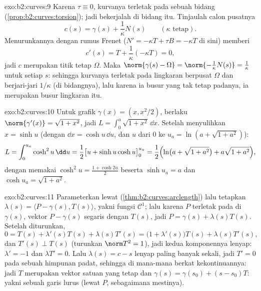 \begin{solution}{exo:b2:curves:9}
Karena $\tau \equiv 0$, kurvanya terletak pada sebuah bidang
(\cref{prop:b2:curves:torsion}); jadi bekerjalah di bidang itu. Tinjaulah
calon pusatnya
\[
c(s) = \gamma(s) + \frac{1}{\kappa}N(s)
\qquad (\kappa \text{ tetap}).
\]
Menurunkannya dengan rumus Frenet ($N' = -\kappa T + \tau B
= -\kappa T$ di sini) memberi
\[
c'(s) = T + \frac1\kappa(-\kappa T) = 0 ,
\]
jadi $c$ merupakan titik tetap $\Omega$. Maka $\norm{\gamma(s) -
\Omega} = \norm{-\frac1\kappa N(s)} = \frac1\kappa$ untuk setiap $s$:
sehingga kurvanya terletak pada lingkaran berpusat $\Omega$ dan berjari-jari
$1/\kappa$ (di bidangnya), lalu karena ia busur yang tak tetap padanya, ia
merupakan busur lingkaran itu.
\end{solution}

\begin{solution}{exo:b2:curves:10}
Untuk grafik $\gamma(x) = (x, x^2/2)$, berlaku $\norm{\gamma'(x)} =
\sqrt{1 + x^2}$, jadi $L = \int_0^a\sqrt{1+x^2}\,\dd x$.
Setelah menyulihkan $x = \sinh u$ (dengan $\dd x = \cosh u\,\dd u$, dan $u$ dari
$0$ ke $u_a = \ln(a + \sqrt{1+a^2})$):
\[
L = \int_0^{u_a}\cosh^2 u\,\dd u
= \frac12\bigl[u + \sinh u\cosh u\bigr]_0^{u_a}
= \frac12\Bigl(\ln\bigl(a + \sqrt{1+a^2}\bigr) +
a\sqrt{1+a^2}\Bigr),
\]
dengan memakai $\cosh^2 u = \frac{1 + \cosh 2u}2$ beserta $\sinh u_a = a$ dan
$\cosh u_a = \sqrt{1 + a^2}$.
\end{solution}

\begin{solution}{exo:b2:curves:11}
Parameterkan lewat 
(\cref{thm:b2:curves:arclength}) lalu tetapkan $\lambda(s) =
\langle P - \gamma(s), T(s)\rangle$, yakni fungsi $\mathcal C^1$;
lalu karena $P$ terletak pada  di $\gamma(s)$,
vektor $P - \gamma(s)$ segaris dengan $T(s)$, jadi $P =
\gamma(s) + \lambda(s)T(s)$. Setelah diturunkan,
\[
0 = T(s) + \lambda'(s)T(s) + \lambda(s)T'(s)
= \bigl(1 + \lambda'(s)\bigr)T(s) + \lambda(s)T'(s),
\]
dan $T'(s) \perp T(s)$ (turunkan $\norm T^2 = 1$), jadi
kedua komponennya lenyap: $\lambda' = -1$ dan $\lambda T' = 0$.
Lalu $\lambda(s) = c - s$ lenyap paling banyak sekali, jadi $T' = 0$
pada sebuah himpunan padat, sehingga di mana-mana berkat kekontinuannya: jadi $T$ merupakan
vektor satuan yang tetap dan $\gamma(s) = \gamma(s_0) + (s -
s_0)T$: yakni sebuah garis lurus (lewat $P$, sebagaimana mestinya).
\end{solution}

